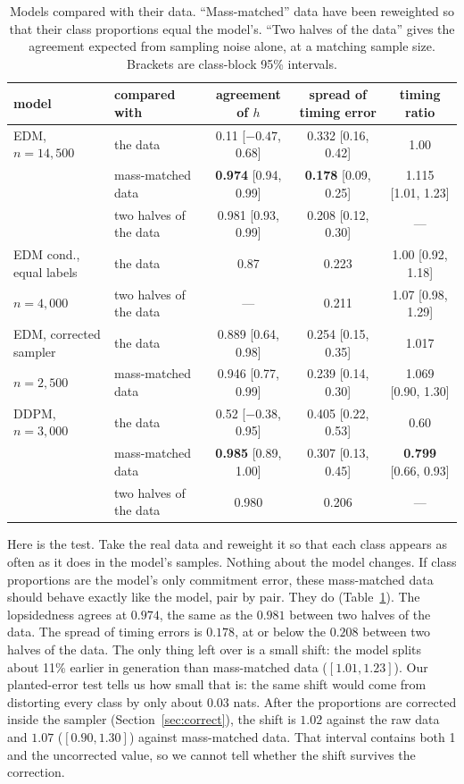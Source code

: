 \documentclass[11pt]{article}
\begin{document}
\begin{table}[t]
\centering
\caption{Models compared with their data. ``Mass-matched'' data have been reweighted so that their class proportions equal the model's. ``Two halves of the data'' gives the agreement expected from sampling noise alone, at a matching sample size. Brackets are class-block 95\% intervals.}
\label{tab:models}
\footnotesize\setlength{\tabcolsep}{4pt}
\begin{tabular}{llccc}
\toprule
model & compared with & agreement of $h$ & spread of timing error & timing ratio \\
\midrule
EDM, $n{=}14{,}500$ & the data & 0.11 [$-0.47$, 0.68] & 0.332 [0.16, 0.42] & 1.00 \\
 & mass-matched data & \textbf{0.974} [0.94, 0.99] & \textbf{0.178} [0.09, 0.25] & 1.115 [1.01, 1.23] \\
 & two halves of the data & 0.981 [0.93, 0.99] & 0.208 [0.12, 0.30] & --- \\
\midrule
EDM cond., equal labels & the data & 0.87 & 0.223 & 1.00 [0.92, 1.18] \\
\quad $n{=}4{,}000$ & two halves of the data & --- & 0.211 & 1.07 [0.98, 1.29] \\
\midrule
EDM, corrected sampler & the data & 0.889 [0.64, 0.98] & 0.254 [0.15, 0.35] & 1.017 \\
\quad $n{=}2{,}500$ & mass-matched data & 0.946 [0.77, 0.99] & 0.239 [0.14, 0.30] & 1.069 [0.90, 1.30] \\
\midrule
DDPM, $n{=}3{,}000$ & the data & 0.52 [$-0.38$, 0.95] & 0.405 [0.22, 0.53] & 0.60 \\
 & mass-matched data & \textbf{0.985} [0.89, 1.00] & 0.307 [0.13, 0.45] & \textbf{0.799} [0.66, 0.93] \\
 & two halves of the data & 0.980 & 0.206 & --- \\
\bottomrule
\end{tabular}
\end{table}

Here is the test. Take the real data and reweight it so that each class appears as often as it does in the model's samples. Nothing about the model changes. If class proportions are the model's only commitment error, these mass-matched data should behave exactly like the model, pair by pair. They do (Table~\ref{tab:models}). The lopsidedness agrees at $0.974$, the same as the $0.981$ between two halves of the data. The spread of timing errors is $0.178$, at or below the $0.208$ between two halves of the data. The only thing left over is a small shift: the model splits about 11\% earlier in generation than mass-matched data ($[1.01,1.23]$). Our planted-error test tells us how small that is: the same shift would come from distorting every class by only about $0.03$ nats. After the proportions are corrected inside the sampler (Section~\ref{sec:correct}), the shift is $1.02$ against the raw data and $1.07$ ($[0.90,1.30]$) against mass-matched data. That interval contains both 1 and the uncorrected value, so we cannot tell whether the shift survives the correction.
\end{document}

